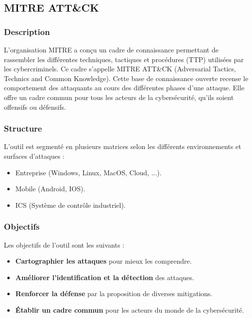 \documentclass[12pt,letterpaper]{article}
\begin{document}
\subsection{MITRE ATT\&CK}

\subsubsection{Description}

L'organisation MITRE a conçu un cadre de connaissance permettant de rassembler les différentes techniques, tactiques et procédures (TTP) utilisées par les cybercriminels.
Ce cadre s'appelle MITRE ATT\&CK (Adversarial Tactics, Technics and Common Knowledge).
Cette base de connaissance ouverte recense le comportement des attaquants au cours des différentes phases d'une attaque. 
Elle offre un cadre commun pour tous les acteurs de la cybersécurité, qu'ils soient offensifs ou défensifs.

\subsubsection{Structure}

L'outil est segmenté en plusieurs matrices selon les différents environnements et surfaces d'attaques :
\begin{itemize}
    \item Entreprise (Windows, Linux, MacOS, Cloud, ...).
    \item Mobile (Android, IOS).
    \item ICS (Système de contrôle industriel).
\end{itemize}

\subsubsection{Objectifs}

Les objectifs de l'outil sont les suivants :
\begin{itemize}
    \item \textbf{Cartographier les attaques} pour mieux les comprendre.
    \item \textbf{Améliorer l'identification et la détection} des attaques.
    \item \textbf{Renforcer la défense} par la proposition de diverses mitigations.
    \item \textbf{Établir un cadre commun} pour les acteurs du monde de la cybersécurité.
\end{itemize}
\end{document}
